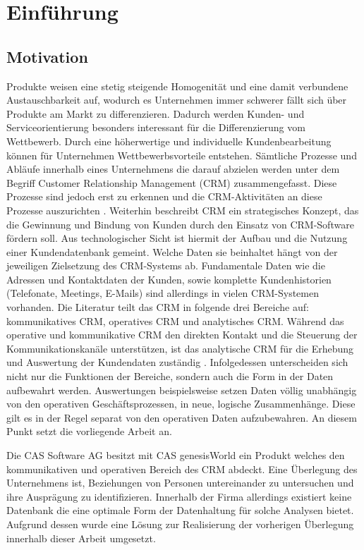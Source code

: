 \chapter{Einführung}
\label{ch:Einfuehrung}

\section{Motivation}
\label{ch:Einfuehrung:sec:Motivation}

Produkte weisen eine stetig steigende Homogenität und eine damit verbundene Austauschbarkeit auf, wodurch es Unternehmen immer schwerer fällt sich über Produkte am Markt zu differenzieren. Dadurch werden Kunden- und Serviceorientierung besonders interessant für die Differenzierung vom Wettbewerb. Durch eine höherwertige und individuelle Kundenbearbeitung können für Unternehmen Wettbewerbsvorteile entstehen. Sämtliche Prozesse und Abläufe innerhalb eines Unternehmens die darauf abzielen werden unter dem Begriff Customer Relationship Management (CRM) zusammengefasst. Diese Prozesse sind jedoch erst zu erkennen und die CRM-Aktivitäten an diese Prozesse auszurichten \cite{SWB-1001}. Weiterhin beschreibt CRM ein strategisches Konzept, das die Gewinnung und Bindung von Kunden durch den Einsatz von CRM-Software fördern soll. Aus technologischer Sicht ist hiermit der Aufbau und die Nutzung einer Kundendatenbank gemeint. Welche Daten sie beinhaltet hängt von der jeweiligen Zielsetzung des CRM-Systems ab. Fundamentale Daten wie die Adressen und Kontaktdaten der Kunden, sowie komplette Kundenhistorien (Telefonate, Meetings, E-Mails) sind allerdings in vielen CRM-Systemen vorhanden. Die Literatur teilt das CRM in folgende drei Bereiche auf: kommunikatives CRM, operatives CRM und analytisches CRM. Während das operative und kommunikative CRM den direkten Kontakt und die Steuerung der Kommunikationskanäle unterstützen, ist das analytische CRM für die Erhebung und Auswertung der Kundendaten zuständig \cite{SWB-375372644}. Infolgedessen unterscheiden sich nicht nur die Funktionen der Bereiche, sondern auch die Form in der Daten aufbewahrt werden. Auswertungen beispielsweise setzen Daten völlig unabhängig von den operativen Geschäftsprozessen, in neue, logische Zusammenhänge. Diese gilt es in der Regel separat von den operativen Daten aufzubewahren. An diesem Punkt setzt die vorliegende Arbeit an. 

Die CAS Software AG besitzt mit CAS genesisWorld ein Produkt welches den kommunikativen und operativen Bereich des CRM abdeckt. Eine Überlegung des Unternehmens ist, Beziehungen von Personen untereinander zu untersuchen und ihre Ausprägung zu identifizieren. Innerhalb der Firma allerdings existiert keine Datenbank die eine optimale Form der Datenhaltung für solche Analysen bietet. Aufgrund dessen wurde eine Lösung zur Realisierung der vorherigen Überlegung innerhalb dieser Arbeit umgesetzt.


